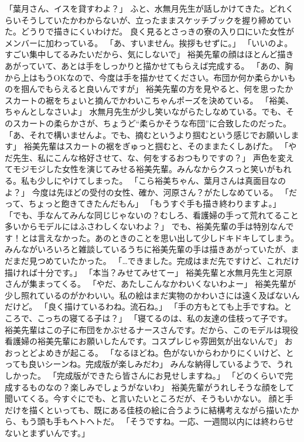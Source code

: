「葉月さん、イスを貸すわよ？」
ふと、水無月先生が話しかけてきた。どれくらいそうしていたかわからないが、立ったままスケッチブックを握り締めていた。どうりで描きにくいわけだ。
良く見るとさっきの寮の入り口にいた女性がメンバーに加わっている。
「あ、すいません。挨拶もせずに。」
「いいのよ。すごい集中してるみたいだから、気にしないで」
裕美先輩の顔はほとんど描きあがっていて、あとは手をしっかりと描かせてもらえば完成する。
「あの、胸から上はもうOKなので、今度は手を描かせてください。布団か何か柔らかいものを掴んでもらえると良いんですが」
裕美先輩の方を見やると、何を思ったかスカートの裾をちょいと摘んでかわいこちゃんポーズを決めている。
「裕美、ちゃんとしなさいよ」
水無月先生が少し笑いながらたしなめている。でも、そのスカートの柔らかさが、ちょうど“柔らかそうな布団”に合致したのだった。
「あ、それで構いませんよ。でも、摘むというより掴むという感じでお願いします」
裕美先輩はスカートの裾をぎゅっと掴むと、そのままたくしあげた。
「やだ先生、私にこんな格好させて、な、何をするおつもりですの？」
声色を変えてモジモジした女性を演じてみせる裕美先輩。みんなからクスっと笑いがもれる。私も少しにやけてしまった。
「こら裕美ちゃん、葉月さんは真面目なのよ？」
今度は先ほどの受付の女性、確か、河原さん？がたしなめている。
「だって、ちょっと飽きてきたんだもん」
「もうすぐ手も描き終わりますよ。」
「でも、手なんてみんな同じじゃないの？むしろ、看護婦の手って荒れてること多いからモデルにはふさわしくないわよ？」
でも、裕美先輩の手は特別なんです！とは言えなかった。あのときのことを思い出して少しドキドキしてしまう。
みんながいろいろと雑談しているうちに裕美先輩の手は描きあがっていたが、まだまだ見つめていたかった。
「…できました。完成はまだ先ですけど、これだけ描ければ十分です。」
「本当？みせてみせてー」
裕美先輩と水無月先生と河原さんが集まってくる。
「やだ、あたしこんなかわいくないわよー」
裕美先輩が少し照れているのがかわいい。私の絵はまだ実物のかわいさには遠く及ばないんだけど。
「良く描けているわね。流石ね。」
「手の方もとても上手ですね。ところで、こっちの寝てる子は？」
「寝てるのは、私の友達の佳枝って子です。裕美先輩はこの子に布団をかぶせるナースさんです。だから、このモデルは現役看護婦の裕美先輩にお願いしたんです。コスプレじゃ雰囲気が出ないんで」
おおっとどよめきが起こる。
「なるほどね。色がないからわかりにくいけど、とっても良いシーンね。完成版が楽しみだわ」
みんな納得しているようで、うれしかった。
「完成版ができたら皆さんにお見せしますね。」
「どのくらいで完成するものなの？楽しみでしょうがないわ」
裕美先輩がうれしそうな顔をして聞いてくる。今すぐにでも、と言いたいところだが、そうもいかない。
顔と手だけを描くといっても、既にある佳枝の絵に合うように結構考えながら描いたから、もう頭も手もヘトヘトだ。
「そうですね。一応、一週間以内には終わらせないとまずいんです。」
